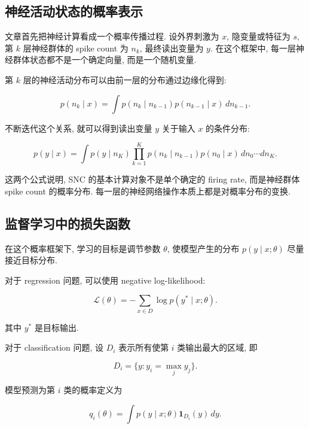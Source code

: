 \documentclass[oneside]{ctexart}
\begin{document}
\subsection{神经活动状态的概率表示}

文章首先把神经计算看成一个概率传播过程. 设外界刺激为 $x$, 隐变量或特征为 $s$, 第 $k$ 层神经群体的 spike count 为 $n_k$, 最终读出变量为 $y$. 在这个框架中, 每一层神经群体状态都不是一个确定向量, 而是一个随机变量.

第 $k$ 层的神经活动分布可以由前一层的分布通过边缘化得到:

\begin{equation}
    p(n_k\mid x)
    =
    \int\limits p(n_k\mid n_{k-1})p(n_{k-1}\mid x)\,dn_{k-1}.
\end{equation}

不断迭代这个关系, 就可以得到读出变量 $y$ 关于输入 $x$ 的条件分布:

\begin{equation}
    p(y\mid x)
    =
    \int\limits
    p(y\mid n_K)
    \prod\limits_{k=1}^{K}p(n_k\mid n_{k-1})
    p(n_0\mid x)\,
    dn_0\cdots dn_K.
\end{equation}

这两个公式说明, SNC 的基本计算对象不是单个确定的 firing rate, 而是神经群体 spike count 的概率分布. 每一层的神经网络操作本质上都是对概率分布的变换.

\subsection{监督学习中的损失函数}

在这个概率框架下, 学习的目标是调节参数 $\theta$, 使模型产生的分布 $p(y\mid x;\theta)$ 尽量接近目标分布.

对于 regression 问题, 可以使用 negative log-likelihood:

\begin{equation}
    \mathcal{L}(\theta)
    =
    -\sum\limits_{x\in D}
    \log p(y^*\mid x;\theta).
\end{equation}

其中 $y^*$ 是目标输出.

对于 classification 问题, 设 $D_i$ 表示所有使第 $i$ 类输出最大的区域, 即

\[
    D_i=\{y:y_i=\max\limits_j y_j\}.
\]

模型预测为第 $i$ 类的概率定义为

\begin{equation}
    q_i(\theta)
    =
    \int\limits p(y\mid x;\theta)\mathbf{1}_{D_i}(y)\,dy.
\end{equation}
\end{document}
